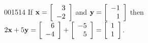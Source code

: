 \begin{example}{}{001514}
If $\textbf{x} = 
\left[ \begin{array}{r}
3 \\
-2 \\
\end{array} \right]$ and $\textbf{y} = \left[ \begin{array}{r}
-1 \\
1 \\
\end{array} \right]$
 then $ 2\textbf{x} + 5\textbf{y} =
\left[ \begin{array}{r}
6 \\
-4 \\
\end{array} \right]
+ 
\left[ \begin{array}{r}
-5 \\
5 \\
\end{array} \right]
=
\left[ \begin{array}{r}
1 \\
1 \\
\end{array} \right]$.
\end{example}


